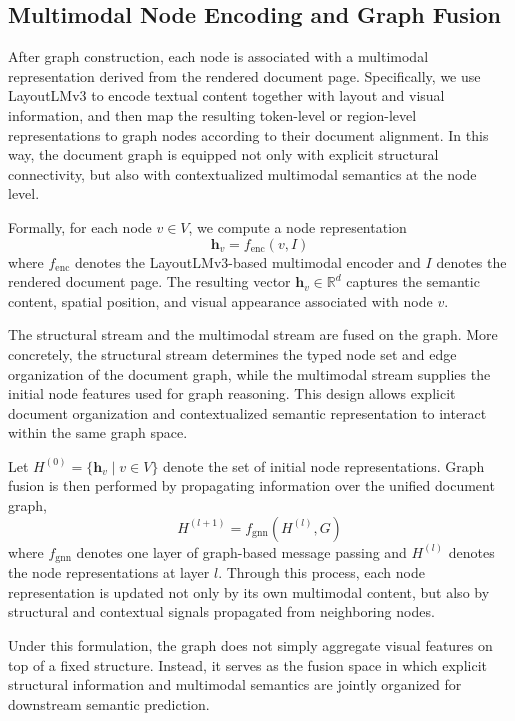\documentclass[pdflatex,twocolumn,iicol,sn-vancouver-num]{sn-jnl}%
\theoremstyle{thmstyleone}%
\theoremstyle{thmstyletwo}%
\theoremstyle{thmstylethree}%
\begin{document}
\subsection{Multimodal Node Encoding and Graph Fusion}

After graph construction, each node is associated with a multimodal representation derived from the rendered document page. Specifically, we use LayoutLMv3 to encode textual content together with layout and visual information, and then map the resulting token-level or region-level representations to graph nodes according to their document alignment. In this way, the document graph is equipped not only with explicit structural connectivity, but also with contextualized multimodal semantics at the node level.

Formally, for each node \(v \in V\), we compute a node representation
\begin{equation}
\mathbf{h}_v = f_{\mathrm{enc}}(v, I)
\end{equation}
where \(f_{\mathrm{enc}}\) denotes the LayoutLMv3-based multimodal encoder and \(I\) denotes the rendered document page. The resulting vector \(\mathbf{h}_v \in \mathbb{R}^d\) captures the semantic content, spatial position, and visual appearance associated with node \(v\).

The structural stream and the multimodal stream are fused on the graph. More concretely, the structural stream determines the typed node set and edge organization of the document graph, while the multimodal stream supplies the initial node features used for graph reasoning. This design allows explicit document organization and contextualized semantic representation to interact within the same graph space.

Let \(H^{(0)} = \{\mathbf{h}_v \mid v \in V\}\) denote the set of initial node representations. Graph fusion is then performed by propagating information over the unified document graph,
\begin{equation}
H^{(l+1)} = f_{\mathrm{gnn}}(H^{(l)}, G)
\end{equation}
where \(f_{\mathrm{gnn}}\) denotes one layer of graph-based message passing and \(H^{(l)}\) denotes the node representations at layer \(l\). Through this process, each node representation is updated not only by its own multimodal content, but also by structural and contextual signals propagated from neighboring nodes.

Under this formulation, the graph does not simply aggregate visual features on top of a fixed structure. Instead, it serves as the fusion space in which explicit structural information and multimodal semantics are jointly organized for downstream semantic prediction.
\end{document}
